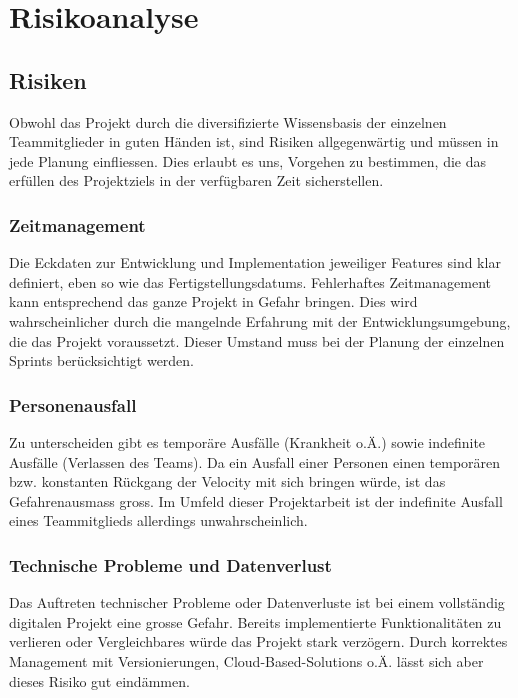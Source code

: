 \documentclass[../main.tex]{subfiles}
\begin{document}
	\section{Risikoanalyse}
	\subsection{Risiken}
	\par Obwohl das Projekt durch die diversifizierte Wissensbasis der einzelnen Teammitglieder in guten Händen ist, sind Risiken allgegenwärtig und müssen in jede Planung einfliessen. Dies erlaubt es uns, Vorgehen zu bestimmen, die das erfüllen des Projektziels in der verfügbaren Zeit sicherstellen. 
	
	\subsubsection{Zeitmanagement}
	\par Die Eckdaten zur Entwicklung und Implementation jeweiliger Features sind klar definiert, eben so wie das Fertigstellungsdatums. Fehlerhaftes Zeitmanagement kann entsprechend das ganze Projekt in Gefahr bringen. Dies wird wahrscheinlicher durch die mangelnde Erfahrung mit der Entwicklungsumgebung, die das Projekt voraussetzt. Dieser Umstand muss bei der Planung der einzelnen Sprints berücksichtigt werden.
	
	\subsubsection{Personenausfall}
	\par Zu unterscheiden gibt es temporäre Ausfälle (Krankheit o.Ä.) sowie indefinite Ausfälle (Verlassen des Teams). Da ein Ausfall einer Personen einen temporären bzw. konstanten Rückgang der Velocity mit sich bringen würde, ist das Gefahrenausmass gross. Im Umfeld dieser Projektarbeit ist der indefinite Ausfall eines Teammitglieds allerdings unwahrscheinlich.
	
	\subsubsection{Technische Probleme und Datenverlust}
	\par Das Auftreten technischer Probleme oder Datenverluste ist bei einem vollständig digitalen Projekt eine grosse Gefahr. Bereits implementierte Funktionalitäten zu verlieren oder Vergleichbares würde das Projekt stark verzögern. Durch korrektes Management mit Versionierungen, Cloud-Based-Solutions o.Ä. lässt sich aber dieses Risiko gut eindämmen.
	
\end{document}
